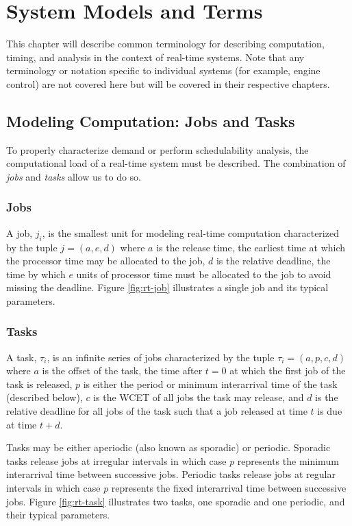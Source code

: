 \section{System Models and Terms}   \label{chap:systemModel}

This chapter will describe common terminology for describing computation, timing, and analysis in the context of real-time systems.
Note that any terminology or notation specific to individual systems (for example, engine control) are not covered here but will be covered in their respective chapters.

\subsection{Modeling Computation: Jobs and Tasks}

To properly characterize demand or perform schedulability analysis, the computational load of a real-time system must be described.
The combination of \textit{jobs} and \textit{tasks} allow us to do so.

\subsubsection{Jobs}

A job, $j_i$, is the smallest unit for modeling real-time computation characterized by the tuple $j = (a,e,d)$ where $a$ is the release time, the earliest time at which the processor time may be allocated to the job, $d$ is the relative deadline, the time by which $e$ units of processor time must be allocated to the job to avoid missing the deadline.
Figure \ref{fig:rt-job} illustrates a single job and its typical parameters.

\subsubsection{Tasks}

A task, $\tau_i$, is an infinite series of jobs characterized by the tuple $\tau_i = (a,p,c,d)$ where $a$ is the offset of the task, the time after $t=0$ at which the first job of the task is released, $p$ is either the period or minimum interarrival time of the task (described below), $c$ is the WCET of all jobs the task may release, and $d$ is the relative deadline for all jobs of the task such that a job released at time $t$ is due at time $t+d$.

Tasks may be either aperiodic (also known as sporadic) or periodic.
Sporadic tasks release jobs at irregular intervals in which case $p$ represents the minimum interarrival time between successive jobs.
Periodic tasks release jobs at regular intervals in which case $p$ represents the fixed interarrival time between successive jobs.
Figure \ref{fig:rt-task} illustrates two tasks, one sporadic and one periodic, and their typical parameters.

